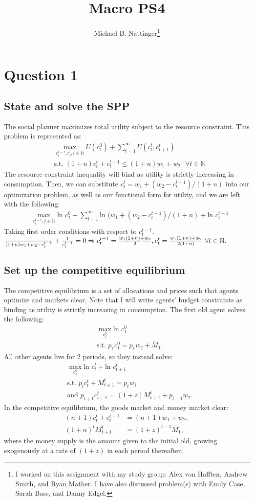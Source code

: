\documentclass[11pt]{article} %
\title{Macro PS4}
\author{Michael B. Nattinger\footnote{I worked on this assignment with my study group: Alex von Hafften, Andrew Smith, and Ryan Mather. I have also discussed problem(s) with Emily Case, Sarah Bass, and Danny Edgel.}}
\begin{document}
\maketitle

\section{Question 1}
\subsection{State and solve the SPP}
The social planner maximizes total utility subject to the resource constraint. This problem is represented as:
\begin{align*}
&\max_{c_{i}^{i-1},c_i^i, i \in \mathbb{N}} U(c_1^0) + \sum_{t=1}^{\infty} U(c_t^t,c_{t+1}^t)\\
&\text{s.t. } (1+n)c_t^t +c_t^{t-1} \leq (1+n)w_1 + w_2 \text{ } \forall t \in \mathbb{N}
\end{align*}
The resource constraint inequality will bind as utility is strictly increasing in consumption. Then, we can substitute $c_t^t = w_1+(w_2-c_t^{t-1})/(1+n)$ into our optimization problem, as well as our functional form for utility, and we are left with the following:
\begin{align*}
&\max_{c_{i}^{i-1}, i \in \mathbb{N}} \text{ln }c_1^0 + \sum_{t=1}^{\infty} \text{ln }(w_1+(w_2-c_t^{t-1})/(1+n) + \text{ln }c_{t}^{t-1}
\end{align*}
Taking first order conditions with respect to $c_t^{t-1}$, $\frac{-1}{(1+n)w_1+w_2-c_t^{t-1}} + \frac{1}{c_t^{t-1}} = 0 \\ \Rightarrow c_t^{t-1} = \frac{w_1(1+n)+w_2}{2}, c_t^t = \frac{w_1(1+n)+w_2}{2(1+n)} \text{ } \forall t \in \mathbb{N}.$ 
\subsection{Set up the competitive equilibrium}
The competitive equilibrium is a set of allocations and prices such that agents optimize and markets clear. Note that I will write agents' budget constraints as binding as utility is strictly increasing in consumption. The first old agent solves the following:
\begin{align*}
&\max_{c_1^0} \text{ln } c_1^0 \\
&\text{s.t. } p_1c_1^0 = p_1w_2 + \bar{M}_1.
\end{align*}
All other agents live for 2 periods, so they instead solve:
\begin{align*}
&\max_{c_1^0} \text{ln } c_t^t + \text{ln } c_{t+1}^t \\
&\text{s.t. } p_tc_t^t + M^t_{t+1}= p_tw_1 \\
&\text{and } p_{t+1}c_{t+1}^t = (1+z)M_{t+1}^t  + p_{t+1}w_2.
\end{align*}
In the competitive equilibrium, the goods market and money market clear:
\begin{align*}
(n+1)c_t^t +c_t^{t-1} &= (n+1)w_1 + w_2, \\
(1+n)^tM_{t+1}^t  &= (1+z)^{t-1}\bar{M}_1,
\end{align*}
where the money supply is the amount given to the initial old, growing exogenously at a rate of $(1+z)$ in each period thereafter.
\end{document}

